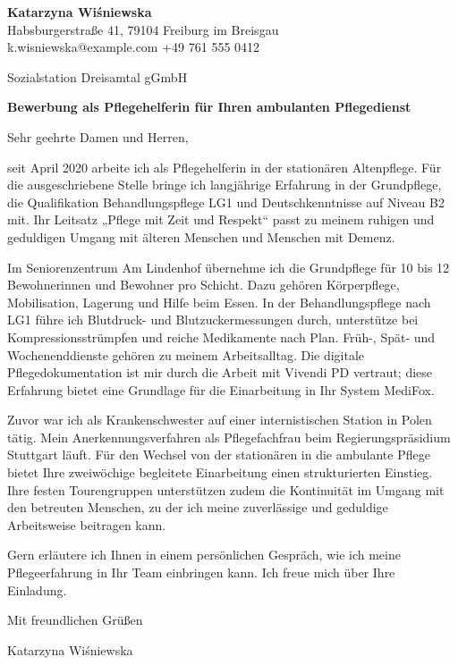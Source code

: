 \documentclass[11pt,a4paper]{article}
\begin{document}
{\large\bfseries\color{primarycolor} Katarzyna Wiśniewska}\\
Habsburgerstraße 41, 79104 Freiburg im Breisgau\\
k.wisniewska@example.com \textbar{} +49 761 555 0412

\vspace{0.6em}
Sozialstation Dreisamtal gGmbH

\vspace{0.6em}
\textbf{Bewerbung als Pflegehelferin für Ihren ambulanten Pflegedienst}

Sehr geehrte Damen und Herren,

seit April 2020 arbeite ich als Pflegehelferin in der stationären Altenpflege. Für die ausgeschriebene Stelle bringe ich langjährige Erfahrung in der Grundpflege, die Qualifikation Behandlungspflege LG1 und Deutschkenntnisse auf Niveau B2 mit. Ihr Leitsatz „Pflege mit Zeit und Respekt“ passt zu meinem ruhigen und geduldigen Umgang mit älteren Menschen und Menschen mit Demenz.

Im Seniorenzentrum Am Lindenhof übernehme ich die Grundpflege für 10 bis 12 Bewohnerinnen und Bewohner pro Schicht. Dazu gehören Körperpflege, Mobilisation, Lagerung und Hilfe beim Essen. In der Behandlungspflege nach LG1 führe ich Blutdruck- und Blutzuckermessungen durch, unterstütze bei Kompressionsstrümpfen und reiche Medikamente nach Plan. Früh-, Spät- und Wochenenddienste gehören zu meinem Arbeitsalltag. Die digitale Pflegedokumentation ist mir durch die Arbeit mit Vivendi PD vertraut; diese Erfahrung bietet eine Grundlage für die Einarbeitung in Ihr System MediFox.

Zuvor war ich als Krankenschwester auf einer internistischen Station in Polen tätig. Mein Anerkennungsverfahren als Pflegefachfrau beim Regierungspräsidium Stuttgart läuft. Für den Wechsel von der stationären in die ambulante Pflege bietet Ihre zweiwöchige begleitete Einarbeitung einen strukturierten Einstieg. Ihre festen Tourengruppen unterstützen zudem die Kontinuität im Umgang mit den betreuten Menschen, zu der ich meine zuverlässige und geduldige Arbeitsweise beitragen kann.

Gern erläutere ich Ihnen in einem persönlichen Gespräch, wie ich meine Pflegeerfahrung in Ihr Team einbringen kann. Ich freue mich über Ihre Einladung.

Mit freundlichen Grüßen

Katarzyna Wiśniewska
\end{document}
